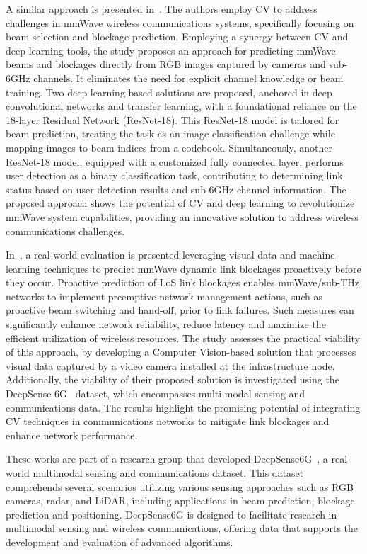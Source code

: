 A similar approach is presented in~\cite{Block_predict2}.
The authors employ CV to address challenges in mmWave wireless communications systems, specifically focusing on beam selection and blockage prediction.
Employing a synergy between CV and deep learning tools, the study proposes an approach for predicting mmWave beams and blockages directly from RGB images captured by cameras and sub-6GHz channels.
It eliminates the need for explicit channel knowledge or beam training.
Two deep learning-based solutions are proposed, anchored in deep convolutional networks and transfer learning, with a foundational reliance on the 18-layer Residual Network (ResNet-18).
This ResNet-18 model is tailored for beam prediction, treating the task as an image classification challenge while mapping images to beam indices from a codebook.
Simultaneously, another ResNet-18 model, equipped with a customized fully connected layer, performs user detection as a binary classification task, contributing to determining link status based on user detection results and sub-6GHz channel information.
The proposed approach shows the potential of CV and deep learning to revolutionize mmWave system capabilities, providing an innovative solution to address wireless communications challenges.

In~\cite{CVAided}, a real-world evaluation is presented leveraging visual data and machine learning techniques to predict mmWave dynamic link blockages proactively before they occur.
Proactive prediction of LoS link blockages enables mmWave/sub-THz networks to implement preemptive network management actions, such as proactive beam switching and hand-off, prior to link failures.
Such measures can significantly enhance network reliability, reduce latency and maximize the efficient utilization of wireless resources.
The study assesses the practical viability of this approach, by developing a Computer Vision-based solution that processes visual data captured by a video camera installed at the infrastructure node.
Additionally, the viability of their proposed solution is investigated using the DeepSense 6G~\cite{deepsense} dataset, which encompasses multi-modal sensing and communications data.
The results highlight the promising potential of integrating CV techniques in communications networks to mitigate link blockages and enhance network performance.

These works are part of a research group that developed DeepSense6G~\cite{deepsense}, a real-world multimodal sensing and communications dataset.
This dataset comprehends several scenarios utilizing various sensing approaches such as RGB cameras, radar, and LiDAR, including applications in beam prediction, blockage prediction and positioning.
DeepSense6G is designed to facilitate research in multimodal sensing and wireless communications, offering data that supports the development and evaluation of advanced algorithms.


